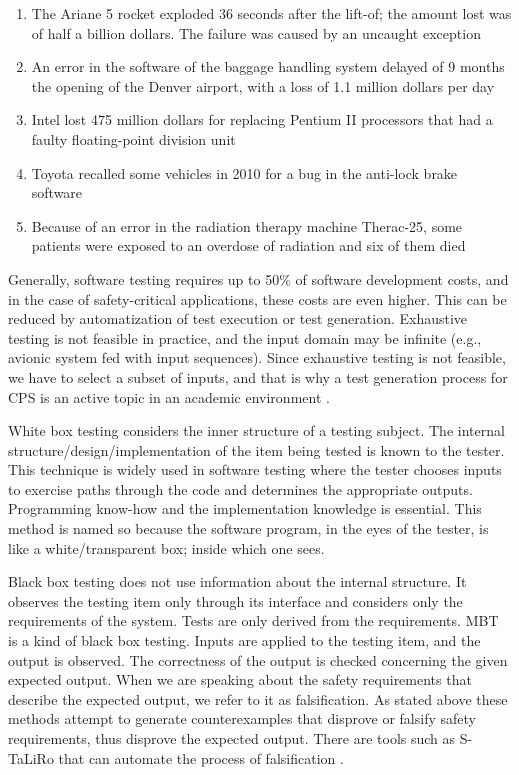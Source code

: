 \begin{enumerate}
    \item The Ariane 5 rocket exploded 36 seconds after the lift-of; the amount lost was of half a billion dollars. The failure was caused by an uncaught exception \cite{Ariane5:Failure}
    \item An error in the software of the baggage handling system delayed of 9 months the opening of the Denver airport, with a loss of 1.1 million dollars per day \cite{Donaldson:DenverAirportProblem}
    \item Intel lost 475 million dollars for replacing Pentium II processors that had a faulty floating-point division unit \cite{Khan:IndustrialInformatics}
    \item Toyota recalled some vehicles in 2010 for a bug in the anti-lock brake software \cite{Fan:Toyota}
    \item Because of an error in the radiation therapy machine Therac-25, some patients were exposed to an overdose of radiation and six of them died \cite{Leveson:Therac25}
\end{enumerate}

Generally, software testing requires up to 50\% of software development costs, and in the case of safety-critical applications, these costs are even higher. This can be reduced by automatization of test execution or test generation. Exhaustive testing is not feasible in practice, and the input domain may be infinite (e.g., avionic system fed with input sequences). Since exhaustive testing is not feasible, we have to select a subset of inputs, and that is why a test generation process for CPS is an active topic in an academic environment \cite{Ratschan:AutomaticAnalysisCPS}.

White box testing considers the inner structure of a testing subject. The internal structure/design/implementation of the item being tested is known to the tester. This technique is widely used in software testing where the tester chooses inputs to exercise paths through the code and determines the appropriate outputs. Programming know-how and the implementation knowledge is essential. This method is named so because the software program, in the eyes of the tester, is like a white/transparent box; inside which one sees.

Black box testing does not use information about the internal structure. It observes the testing item only through its interface and considers only the requirements of the system. Tests are only derived from the requirements. MBT is a kind of black box testing. Inputs are applied to the testing item, and the output is observed. The correctness of the output is checked concerning the given expected output. When we are speaking about the safety requirements that describe the expected output, we refer to it as falsification. As stated above these methods attempt to generate counterexamples that disprove or falsify safety requirements, thus disprove the expected output. There are tools such as S-TaLiRo that can automate the process of falsification \cite{Fainekos:sTaLiRo}.

